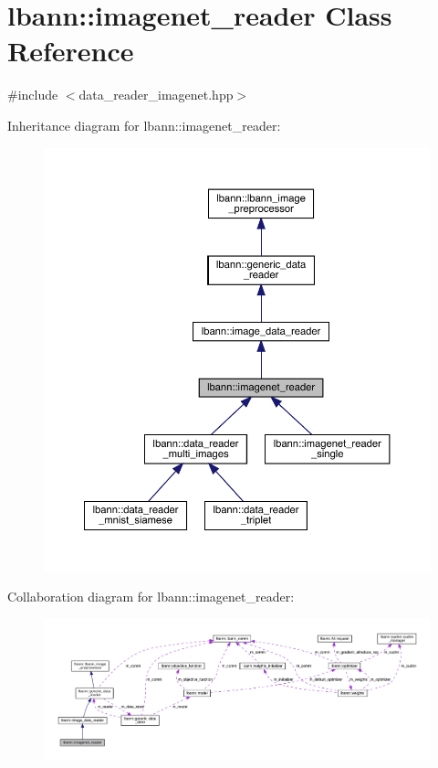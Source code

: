 \hypertarget{classlbann_1_1imagenet__reader}{}\section{lbann\+:\+:imagenet\+\_\+reader Class Reference}
\label{classlbann_1_1imagenet__reader}


{\ttfamily \#include $<$data\+\_\+reader\+\_\+imagenet.\+hpp$>$}



Inheritance diagram for lbann\+:\+:imagenet\+\_\+reader\+:\nopagebreak
\begin{figure}[H]
\begin{center}
\leavevmode
\includegraphics[width=350pt]{classlbann_1_1imagenet__reader__inherit__graph}
\end{center}
\end{figure}


Collaboration diagram for lbann\+:\+:imagenet\+\_\+reader\+:\nopagebreak
\begin{figure}[H]
\begin{center}
\leavevmode
\includegraphics[width=350pt]{classlbann_1_1imagenet__reader__coll__graph}
\end{center}
\end{figure}

